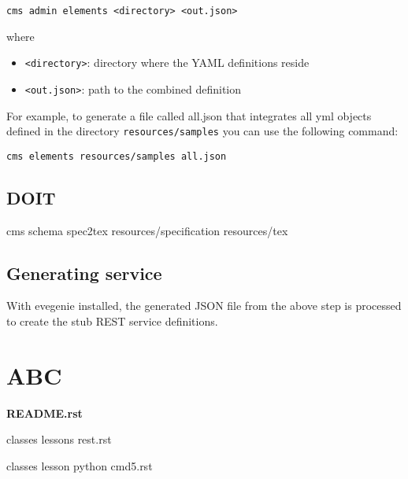 \documentclass[9pt,twocolumn,twoside]{styles/osajnl}
\begin{document}
\begin{verbatim}
cms admin elements <directory> <out.json>
\end{verbatim}

where

\begin{itemize}
\item \verb+<directory>+: directory where the YAML definitions reside
\item \verb+<out.json>+: path to the combined definition
\end{itemize}

For example, to generate a file called all.json that integrates all
yml objects defined in the directory \verb+resources/samples+ you can
use the following command:

\begin{verbatim}
cms elements resources/samples all.json
\end{verbatim}

\subsection{DOIT}


cms schema spec2tex resources/specification resources/tex

\subsection{Generating service}

With evegenie installed, the generated JSON file from the above step
is processed to create the stub REST service definitions.


\section{ABC}
{\bf README.rst}

classes lessons rest.rst

classes lesson python cmd5.rst

\end{document}
